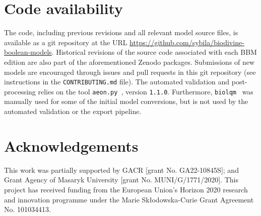 \documentclass[fleqn,10pt]{wlscirep}
\begin{document}

\section*{Code availability}

The code, including previous revisions and all relevant model source files, is available as a git repository at the URL \hyperlink{https://github.com/sybila/biodivine-boolean-models}{https://github.com/sybila/biodivine-boolean-models}. Historical revisions of the source code associated with each BBM edition are also part of the aforementioned Zenodo packages. Submissions of new models are encouraged through issues and pull requests in this git repository (see instructions in the \texttt{CONTRIBUTING.md} file). The automated validation and post-processing relies on the tool \texttt{aeon.py}~\cite{aeonpy}, version \texttt{1.1.0}. Furthermore, \texttt{biolqm}~\cite{biolqm} was manually used for some of the initial model conversions, but is not used by the automated validation or the export pipeline.




\section*{Acknowledgements}

This work was partially supported by GACR [grant No. GA22-10845S]; and
Grant Agency of Masaryk University [grant No. MUNI/G/1771/2020]. This project has received funding from the European Union’s Horizon 2020 research and innovation programme under the Marie Skłodowska-Curie Grant Agreement No. 101034413.
\end{document}
